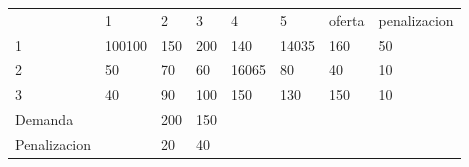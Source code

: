 \begin{itemize}
\begin{tabular}{l|l|l|l|l|l|ll}
\multicolumn{1}{l}{}             & \multicolumn{1}{l}{1}                  & \multicolumn{1}{l}{2}             & \multicolumn{1}{l}{3}   & \multicolumn{1}{l}{4}                   & \multicolumn{1}{l}{5}                   & oferta & penalizacion                  \\ 
\hhline{~-----~>{\arrayrulecolor[rgb]{0.4,0,0}}-}
1                                & 100100                                 & {\cellcolor[rgb]{0.8,0.518,0}}150 & 200                     & {\cellcolor[rgb]{0.169,0.169,0.514}}140 & 14035                                   & 160    & {\cellcolor[rgb]{0.4,0,0}}50  \\ 
\hhline{~>{\arrayrulecolor{black}}-----~~}
2                                & {\cellcolor[rgb]{0.169,0.169,0.514}}50 & 70                                & 60                      & 16065                                   & {\cellcolor[rgb]{0.169,0.169,0.514}}80  & 40     & 10                            \\ 
\hhline{~-----~~}
3                                & {\cellcolor[rgb]{0.169,0.169,0.514}}40 & 90                                & 100                     & {\cellcolor[rgb]{0.169,0.169,0.514}}150 & {\cellcolor[rgb]{0.169,0.169,0.514}}130 & 150    & 10                            \\ 
\cline{2-6}
\multicolumn{1}{l}{Demanda}      & \multicolumn{1}{l}{}                & \multicolumn{1}{l}{200}           & \multicolumn{1}{l}{150} & \multicolumn{1}{l}{}                    & \multicolumn{1}{l}{}                    &        &                               \\
\multicolumn{1}{l}{Penalizacion} & \multicolumn{1}{l}{}                   & \multicolumn{1}{l}{20}            & \multicolumn{1}{l}{40}  & \multicolumn{1}{l}{}                    & \multicolumn{1}{l}{}                    &        &                              
\end{tabular}



\end{itemize}
